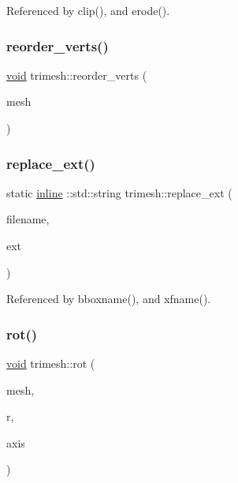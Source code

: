 Referenced by clip(), and erode().

\mbox{\label{namespacetrimesh_a69f38c2c1647027b3c1b50e8244dc6e3}} 
\subsubsection{\texorpdfstring{reorder\+\_\+verts()}{reorder\_verts()}}
{\footnotesize\ttfamily \hyperlink{namespacetrimesh_a784ddfd979e1c579bda795a8edfc3f43}{void} trimesh\+::reorder\+\_\+verts (\begin{DoxyParamCaption}\item[{\hyperlink{classtrimesh_1_1TriMesh}{Tri\+Mesh} $\ast$}]{mesh }\end{DoxyParamCaption})}

\mbox{\label{namespacetrimesh_a19623fde9977f1ed5597291d8661621f}} 
\subsubsection{\texorpdfstring{replace\+\_\+ext()}{replace\_ext()}}
{\footnotesize\ttfamily static \hyperlink{XForm_8h_a00d24c7231be28dbaf71f5408f30e44c}{inline} \+::std\+::string trimesh\+::replace\+\_\+ext (\begin{DoxyParamCaption}\item[{const \+::std\+::string \&}]{filename,  }\item[{const \+::std\+::string \&}]{ext }\end{DoxyParamCaption})\hspace{0.3cm}{\ttfamily [static]}}



Referenced by bboxname(), and xfname().

\mbox{\label{namespacetrimesh_a56d92b6392bcb92a44c3fff9d26b7711}} 
\subsubsection{\texorpdfstring{rot()}{rot()}}
{\footnotesize\ttfamily \hyperlink{namespacetrimesh_a784ddfd979e1c579bda795a8edfc3f43}{void} trimesh\+::rot (\begin{DoxyParamCaption}\item[{\hyperlink{classtrimesh_1_1TriMesh}{Tri\+Mesh} $\ast$}]{mesh,  }\item[{float}]{r,  }\item[{const \hyperlink{namespacetrimesh_a4fc2b83feba99c931f837a0c7d4b4df1}{vec} \&}]{axis }\end{DoxyParamCaption})}



